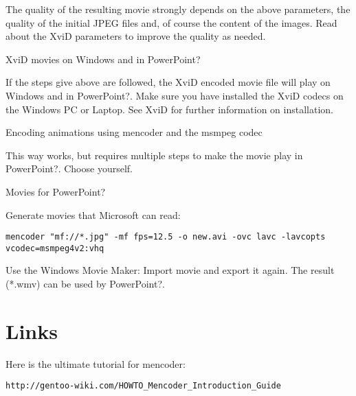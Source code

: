  The quality of the resulting movie strongly depends on the above
parameters, the quality of the initial JPEG files and, of course the
content of the images. Read about the XviD parameters to improve the
quality as needed.

XviD movies on Windows and in PowerPoint?

 If the steps give above are followed, the XviD encoded movie file
will play on Windows and in PowerPoint?. Make sure you have installed
the XviD codecs on the Windows PC or Laptop. See XviD for further
information on installation.

Encoding animations using mencoder and the msmpeg codec

 This way works, but requires multiple steps to make the movie play in
PowerPoint?. Choose yourself.

 Movies for PowerPoint?

Generate movies that Microsoft can read: 
\begin{verbatim}
mencoder "mf://*.jpg" -mf fps=12.5 -o new.avi -ovc lavc -lavcopts vcodec=msmpeg4v2:vhq
\end{verbatim}

Use the Windows Movie Maker: Import movie and export it again. The result (*.wmv) can be used by PowerPoint?.

\section{Links}
Here is the ultimate tutorial for mencoder: 
\begin{verbatim}
http://gentoo-wiki.com/HOWTO_Mencoder_Introduction_Guide
\end{verbatim}
 
